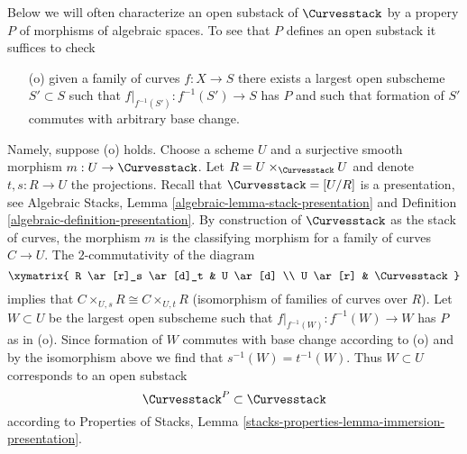 \noindent
Below we will often characterize an open substack of $\Curvesstack$
by a propery $P$ of morphisms of algebraic spaces. To see that $P$
defines an open substack it suffices to check
\begin{enumerate}
\item[(o)] given a family of curves $f : X \to S$ there exists
a largest open subscheme $S' \subset S$ such that
$f|_{f^{-1}(S')} : f^{-1}(S') \to S$ has $P$ and such that
formation of $S'$ commutes with arbitrary base change.
\end{enumerate}
Namely, suppose (o) holds. Choose a scheme $U$ and a surjective
smooth morphism $m : U \to \Curvesstack$. Let
$R = U \times_{\Curvesstack} U$ and denote $t, s : R \to U$
the projections. Recall that $\Curvesstack = [U/R]$ is a presentation,
see Algebraic Stacks, Lemma \ref{algebraic-lemma-stack-presentation} and
Definition \ref{algebraic-definition-presentation}.
By construction of $\Curvesstack$ as
the stack of curves, the morphism $m$ is the classifying morphism
for a family of curves $C \to U$. The $2$-commutativity
of the diagram
$$
\xymatrix{
R \ar[r]_s \ar[d]_t & U \ar[d] \\
U \ar[r] & \Curvesstack
}
$$
implies that $C \times_{U, s} R  \cong C \times_{U, t} R$
(isomorphism of families of curves over $R$). Let $W \subset U$
be the largest open subscheme such that
$f|_{f^{-1}(W)} : f^{-1}(W) \to W$ has $P$ as in (o).
Since formation of $W$ commutes with base change according to (o)
and by the isomorphism above we find that $s^{-1}(W) = t^{-1}(W)$.
Thus $W \subset U$ corresponds to an open substack
$$
\Curvesstack^P \subset \Curvesstack
$$
according to Properties of Stacks, Lemma
\ref{stacks-properties-lemma-immersion-presentation}.

